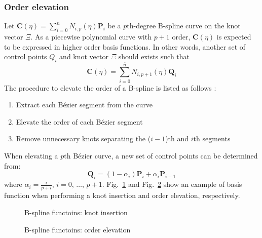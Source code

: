 \subsubsection{Order elevation}
\label{lr_sec:nurbs_order_ele}
Let $
\mathbf{C}(\eta) =  \sum_{i=0}^n
                    N_{i,p}(\eta)
                    \mathbf{P}_i
$
be a $p$th-degree B-spline curve on the knot vector $\Xi$.
As a piecewise polynomial curve with $p+1$ order, $\mathbf{C}(\eta)$ is expected to be expressed in higher order basis functions.
In other words, another set of control points $Q_i$ and knot vector $\Xi$ should exists such that
\begin{equation}
    \mathbf{C}(\eta) =  \sum_{i=0}^{\overline{n}}
                        N_{i, p+1}(\eta)
                        \mathbf{Q}_i
\end{equation}
The procedure to elevate the order of a B-spline is listed as follows \cite{Pie1997}:
\begin{enumerate}
    \item Extract each Bézier segment from the curve
    \item Elevate the order of each Bézier segment
    \item Remove unnecessary knots separating the ($i-1$)th and $i$th segments
\end{enumerate}
When elevating a $p$th Bézier curve, a new set of control points can be determined from:
\begin{equation}
    \mathbf{Q}_i =  (1-\alpha_i) \mathbf{P}_i +
                    \alpha_i \mathbf{P}_{i-1}
\end{equation}
where $\alpha_i=\frac{i}{p+i}$, $i=0$, $\dots$, $p+1$.
Fig.~\ref{lr_fig:nurbs_knotins} and Fig.~\ref{lr_fig:nurbs_orderele} show an example of basis function when performing a knot insertion and order elevation, respectively.

\begin{figure}[h!]
    \centering
    
    \caption{B-spline functoins: knot insertion}
    \label{lr_fig:nurbs_knotins}
\end{figure}

\begin{figure}[h!]
    \centering
    
    \caption{B-spline functoins: order elevation}
    \label{lr_fig:nurbs_orderele}
\end{figure}

